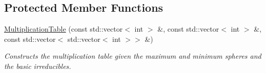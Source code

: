 \subsection*{Protected Member Functions}
\begin{DoxyCompactItemize}
\item 
\hyperlink{classMackey_1_1MultiplicationTable_a3a7fcf71b8235a641b3e716064a3e384}{Multiplication\+Table} (const std\+::vector$<$ int $>$ \&, const std\+::vector$<$ int $>$ \&, const std\+::vector$<$ std\+::vector$<$ int $>$$>$ \&)
\begin{DoxyCompactList}\small\item\em Constructs the multiplication table given the maximum and minimum spheres and the basic irreducibles. \end{DoxyCompactList}\end{DoxyCompactItemize}
